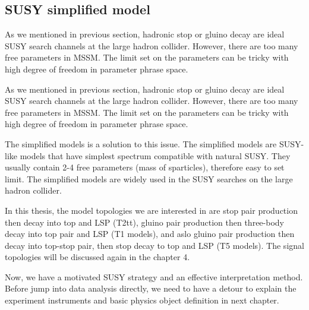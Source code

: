 \clearpage
\subsection{SUSY simplified model}
As we mentioned in previous section, hadronic stop or gluino decay are ideal SUSY search channels at the large hadron collider. However, there are too many free parameters in MSSM. The limit set on the parameters can be tricky with high degree of freedom in parameter phrase space. 

As we mentioned in previous section, hadronic stop or gluino decay are ideal SUSY search channels at the large hadron collider. However, there are too many free parameters in MSSM. The limit set on the parameters can be tricky with high degree of freedom in parameter phrase space. 

The simplified models\cite{Alwall:2008ag} is a solution to this issue. The simplified models are SUSY-like models that have simplest spectrum compatible with natural SUSY. They usually contain 2-4 free parameters (mass of sparticles), therefore easy to set limit. The simplified models are widely used in the SUSY searches on the large hadron collider\cite{CMS-SMS-paper}.

In this thesis, the model topologies we are interested in are stop pair production then decay into top and LSP (T2tt), gluino pair production then three-body decay into top pair and LSP (T1 models), and aslo gluino pair production then decay into top-stop pair, then stop decay to top and LSP (T5 models). The signal topologies will be discussed again in the chapter 4.

Now, we have a motivated SUSY strategy and an effective interpretation method. Before jump into data analysis directly, we need to have a detour to explain the experiment instruments and basic physics object definition in next chapter. 
